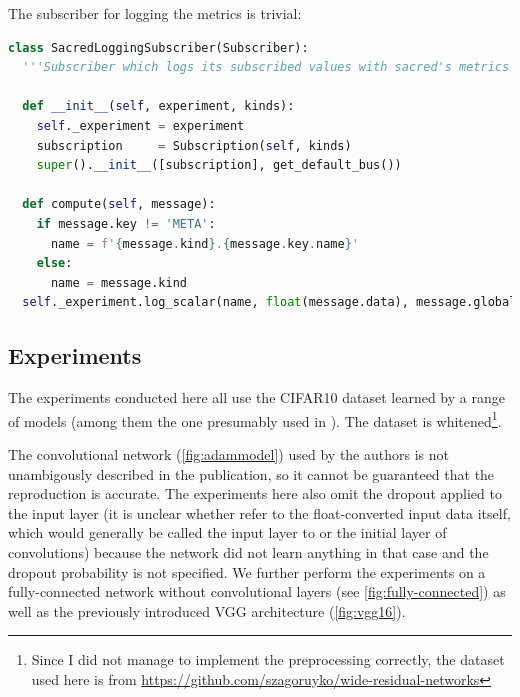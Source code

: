 The subscriber for logging the metrics is trivial:
\begin{lstlisting}[language=Python]
class SacredLoggingSubscriber(Subscriber):
  '''Subscriber which logs its subscribed values with sacred's metrics API'''

  def __init__(self, experiment, kinds):
    self._experiment = experiment
    subscription     = Subscription(self, kinds)
    super().__init__([subscription], get_default_bus())

  def compute(self, message):
    if message.key != 'META':
      name = f'{message.kind}.{message.key.name}'
    else:
      name = message.kind
  self._experiment.log_scalar(name, float(message.data), message.global_step)
\end{lstlisting}


\subsection{Experiments}%
\label{sub:experiments}

The experiments conducted here all use the CIFAR10 dataset learned by a range of
models (among them the one presumably used in \citet{kingma2014adam}). The
dataset is whitened\footnote{Since I did not manage to implement the
preprocessing correctly, the dataset used here is from
\url{https://github.com/szagoruyko/wide-residual-networks}}.

The convolutional network (\cref{fig:adammodel}) used by the authors is not unambigously described in
the publication, so it cannot be guaranteed that the reproduction is accurate.
The experiments here also omit the dropout applied to the input layer (it is
unclear whether \citeauthor{kingma2014adam} refer to the float-converted input
data itself, which would generally be called the input layer to or the initial
layer of convolutions) because the network did not learn anything in that case
and the dropout probability is not specified. We further perform the experiments
on a fully-connected network without convolutional layers (see
\cref{fig:fully-connected}) as well as the previously introduced VGG
architecture (\cref{fig:vgg16}).

